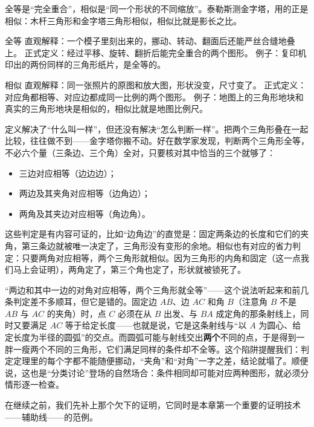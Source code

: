 全等是“完全重合”，相似是“同一个形状的不同缩放”。泰勒斯测金字塔，用的正是相似：木杆三角形和金字塔三角形相似，相似比就是影长之比。

\begin{shuyu}{全等}
直观解释：一个模子里刻出来的，挪动、转动、翻面后还能严丝合缝地叠上。
正式定义：经过平移、旋转、翻折后能完全重合的两个图形。
例子：复印机印出的两份同样的三角形纸片，是全等的。
\end{shuyu}

\begin{shuyu}{相似}
直观解释：同一张照片的原图和放大图，形状没变，尺寸变了。
正式定义：对应角都相等、对应边都成同一比例的两个图形。
例子：地图上的三角形地块和真实的三角形地块是相似的，相似比就是地图比例尺。
\end{shuyu}

定义解决了“什么叫一样”，但还没有解决“怎么判断一样”。把两个三角形叠在一起比较，往往做不到——金字塔你搬不动。好在数学家发现，判断两个三角形全等，不必六个量（三条边、三个角）全对，只要核对其中恰当的三个就够了：

\begin{itemize}
\item 三边对应相等（边边边）；
\item 两边及其夹角对应相等（边角边）；
\item 两角及其夹边对应相等（角边角）。
\end{itemize}

这些判定是有内容可证的，比如“边角边”的直觉是：固定两条边的长度和它们的夹角，第三条边就被唯一决定了，三角形没有变形的余地。相似也有对应的省力判定：只要两角对应相等，两个三角形就相似。因为三角形的内角和固定（这一点我们马上会证明），两角定了，第三个角也定了，形状就被锁死了。

\begin{fanli}
“两边和其中一边的对角对应相等，两个三角形就全等”——这个说法听起来和前几条判定差不多顺耳，但它是错的。固定边 $AB$、边 $AC$ 和角 $B$（注意角 $B$ 不是 $AB$ 与 $AC$ 的夹角）时，点 $C$ 必须在从 $B$ 出发、与 $BA$ 成定角的那条射线上，同时又要满足 $AC$ 等于给定长度——也就是说，它是这条射线与“以 $A$ 为圆心、给定长度为半径的圆弧”的交点。而圆弧可能与射线交出\textbf{两个}不同的点，于是得到一胖一瘦两个不同的三角形，它们满足同样的条件却不全等。这个陷阱提醒我们：判定定理里的每个字都不能随便挪动，“夹角”和“对角”一字之差，结论就塌了。顺便说，这也是“分类讨论”登场的自然场合：条件相同却可能对应两种图形，就必须分情形逐一检查。
\end{fanli}

在继续之前，我们先补上那个欠下的证明，它同时是本章第一个重要的证明技术——辅助线——的范例。

